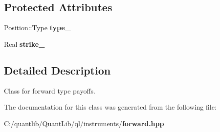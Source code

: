 \subsection*{Protected Attributes}
\begin{DoxyCompactItemize}
\item 
Position\+::\+Type {\bfseries type\+\_\+}\label{class_quant_lib_1_1_forward_type_payoff_a65f594b7499818a9e5bf1739eb0023e3}

\item 
Real {\bfseries strike\+\_\+}\label{class_quant_lib_1_1_forward_type_payoff_a1b7f376c533359c12e3b0c56f4f94194}

\end{DoxyCompactItemize}


\subsection{Detailed Description}
Class for forward type payoffs. 

The documentation for this class was generated from the following file\+:\begin{DoxyCompactItemize}
\item 
C\+:/quantlib/\+Quant\+Lib/ql/instruments/{\bf forward.\+hpp}\end{DoxyCompactItemize}
